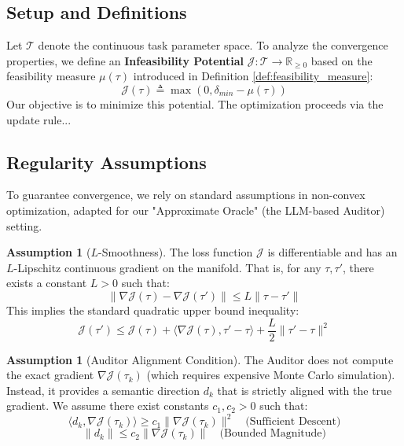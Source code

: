 \documentclass{article}
\theoremstyle{plain}
\theoremstyle{definition}
\newtheorem{assumption}[theorem]{Assumption}
\theoremstyle{remark}
\begin{document}
\subsection{Setup and Definitions}

Let $\mathcal{T}$ denote the continuous task parameter space. To analyze the convergence properties, we define an \textbf{Infeasibility Potential} $\mathcal{J}: \mathcal{T} \to \mathbb{R}_{\ge 0}$ based on the feasibility measure $\mu(\tau)$ introduced in Definition \ref{def:feasibility_measure}:
\begin{equation}
    \mathcal{J}(\tau) \triangleq \max\left(0, \delta_{min} - \mu(\tau)\right)
\end{equation}
Our objective is to minimize this potential. The optimization proceeds via the update rule...

\subsection{Regularity Assumptions}

To guarantee convergence, we rely on standard assumptions in non-convex optimization, adapted for our "Approximate Oracle" (the LLM-based Auditor) setting.

\begin{assumption}[$L$-Smoothness]
    \label{ass:smoothness_detailed}
    The loss function $\mathcal{J}$ is differentiable and has an $L$-Lipschitz continuous gradient on the manifold. That is, for any $\tau, \tau'$, there exists a constant $L > 0$ such that:
    \begin{equation}
        \| \nabla \mathcal{J}(\tau) - \nabla \mathcal{J}(\tau') \| \le L \| \tau - \tau' \|
    \end{equation}
    This implies the standard quadratic upper bound inequality:
    \begin{equation}
        \label{eq:quadratic_bound}
        \mathcal{J}(\tau') \le \mathcal{J}(\tau) + \langle \nabla \mathcal{J}(\tau), \tau' - \tau \rangle + \frac{L}{2} \| \tau' - \tau \|^2
    \end{equation}
\end{assumption}

\begin{assumption}[Auditor Alignment Condition]
    \label{ass:alignment_detailed}
    The Auditor does not compute the exact gradient $\nabla \mathcal{J}(\tau_k)$ (which requires expensive Monte Carlo simulation). Instead, it provides a semantic direction $d_k$ that is strictly aligned with the true gradient. We assume there exist constants $c_1, c_2 > 0$ such that:
    \begin{equation}
        \langle d_k, \nabla \mathcal{J}(\tau_k) \rangle \ge c_1 \| \nabla \mathcal{J}(\tau_k) \|^2 \quad \text{(Sufficient Descent)}
    \end{equation}
    \begin{equation}
        \| d_k \| \le c_2 \| \nabla \mathcal{J}(\tau_k) \| \quad \text{(Bounded Magnitude)}
    \end{equation}
\end{assumption}
\end{document}
